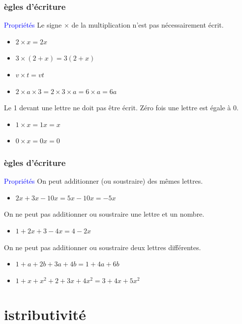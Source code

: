 \documentclass{beamer}
\begin{document}
\begin{frame}
  \frametitle{ ègles d'écriture}
  \begin{block}{\textcolor{blue}{Propriétés}}
    Le signe $\times$ de la multiplication n'est pas nécessairement écrit.
    \begin{itemize}
    \item $2 \times x          = 2x$
    \item $3 \times (2 + x)    = 3(2 + x)$
    \item $v \times t          = vt$
    \item $2 \times a \times 3 = 2 \times 3 \times a = 6 \times a = 6a$
    \end{itemize}
    Le 1 devant une lettre ne doit pas être écrit. Zéro fois une lettre est égale à 0. 
    \begin{itemize}
    \item $1 \times x          = 1x = x$
    \item $0 \times x          = 0x = 0$
    \end{itemize}
  \end{block}
\end{frame}

\begin{frame}
  \frametitle{ ègles d'écriture}
  \begin{block}{\textcolor{blue}{Propriétés}}
    On peut additionner (ou soustraire) des mêmes lettres.
    \begin{itemize}
    \item $2x + 3x - 10x = 5x - 10x = -5x$
    \end{itemize}
    On ne peut pas additionner ou soustraire une lettre et un nombre.
    \begin{itemize}
    \item $1 + 2x + 3 - 4x = 4 - 2x$
    \end{itemize}
    On ne peut pas additionner ou soustraire deux lettres différentes.
    \begin{itemize} 
    \item $1 + a + 2b + 3a +4b = 1 + 4a + 6b$
    \item $1 + x + x^2 + 2 + 3x + 4x^2 = 3 + 4x + 5x^2$
    \end{itemize}
  \end{block}  
\end{frame}

\section{ istributivité}
\end{document}

